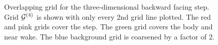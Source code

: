 \documentclass[11pt]{article}
\begin{document}
{
\begin{figure}[hbt]
\newcommand{\figWidth}{10cm}
\newcommand{\trimfig}[2]{\trimFigb{#1}{#2}{0.025}{.0}{.05}{.3}}
\newcommand{\figWidtha}{5.5cm}
\newcommand{\trimfiga}[2]{\trimFigb{#1}{#2}{0.0}{.0}{.0}{.0}}
\begin{center}\small
\caption{
Overlapping grid for the three-dimensional backward facing step. Grid ${\mathcal G}^{(4)}$ is shown with only every 2nd grid line plotted.
The red and pink grids cover the step. The green grid covers the
body and near wake. The blue background grid is coarsened by a factor of 2. 
}
\label{fig:backStepGrids}
\end{center}
\end{figure}
}


\end{document}
